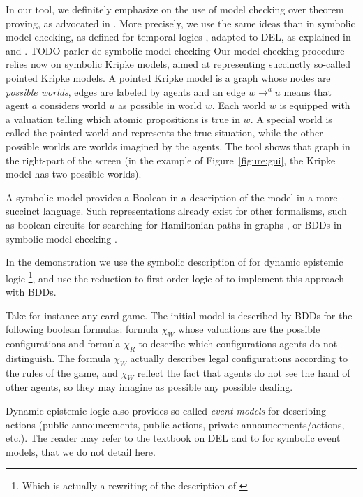 In our tool, we definitely emphasize on the use of model checking over theorem proving, as advocated in \cite{DBLP:conf/kr/HalpernV91}. More precisely, we use the same ideas than in symbolic model checking, as defined for temporal logics \cite{DBLP:conf/lics/BurchCMDH90}, adapted to DEL, as explained in \cite{DBLP:conf/atal/CharrierS17} and \cite{DBLP:conf/aiml/CharrierS18}. TODO parler de symbolic model checking Our model checking procedure relies now on symbolic Kripke models, aimed at representing succinctly so-called pointed Kripke models. A pointed Kripke model is a graph whose nodes are \emph{possible worlds}, edges are labeled by agents and an edge $w \rightarrow^a u$ means that agent $a$ considers world $u$ as possible in world $w$. Each world $w$ is equipped with a valuation telling which atomic propositions is true in $w$. A special world is called the pointed world and represents the true situation, while the other possible worlds are worlds imagined by the agents.
The tool shows that graph in the right-part of the screen (in the example of Figure~\ref{figure:gui}, the Kripke model has two possible worlds). 


\newcommand{\succinctsetworlds}{\chi}
\newcommand{\succinctrelation}[1]{\pi_{#1}}
 A symbolic model provides a Boolean  in a description of the model in a more succinct language. Such representations already exist for other formalisms, such as boolean circuits for searching for Hamiltonian paths in graphs \cite{papadimitriou2003computational}, or BDDs in symbolic model checking .

In the demonstration we use the symbolic description of \cite{DBLP:conf/aiml/CharrierS18} for dynamic epistemic logic \footnote{Which is actually a rewriting of the description of \cite{DBLP:conf/atal/CharrierS17}}, and use the reduction to first-order logic of \cite{DBLP:conf/tableaux/CharrierPS17} to implement this approach with BDDs.

Take for instance any card game. The initial model is described by BDDs for the following boolean formulas: formula $\chi_W$  whose valuations are the possible configurations and formula $\chi_R$ to describe which configurations agents do not distinguish. The formula $\chi_W$ actually describes legal configurations according to the rules of the game, and $\chi_W$ reflect the fact that agents do not see the hand of other agents, so they may imagine as possible any possible dealing.

Dynamic epistemic logic also provides so-called \emph{event models} for describing actions (public announcements, public actions, private announcements/actions, etc.). The reader may refer to the textbook on DEL \cite{DitmarschvdHoekKooi} and to \cite{DBLP:conf/atal/CharrierS17} for symbolic event models, that we do not detail here.